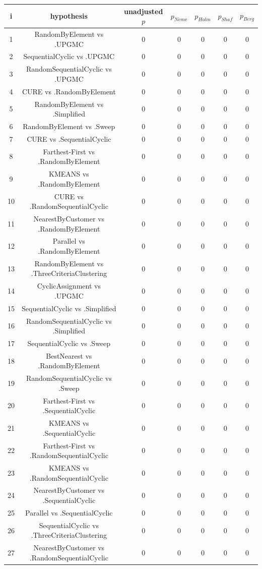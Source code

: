 \documentclass[a4paper,10pt]{article}
\begin{document}
\begin{landscape}
\begin{table}[!htp]
\centering\scriptsize
\begin{tabular}{ccccccc}
i&hypothesis&unadjusted $p$&$p_{Neme}$&$p_{Holm}$&$p_{Shaf}$&$p_{Berg}$\\
\hline1&RandomByElement vs .UPGMC&0&0&0&0&0\\
2&SequentialCyclic vs .UPGMC&0&0&0&0&0\\
3&RandomSequentialCyclic vs .UPGMC&0&0&0&0&0\\
4&CURE vs .RandomByElement&0&0&0&0&0\\
5&RandomByElement vs .Simplified&0&0&0&0&0\\
6&RandomByElement vs .Sweep&0&0&0&0&0\\
7&CURE vs .SequentialCyclic&0&0&0&0&0\\
8&Farthest-First vs .RandomByElement&0&0&0&0&0\\
9&KMEANS vs .RandomByElement&0&0&0&0&0\\
10&CURE vs .RandomSequentialCyclic&0&0&0&0&0\\
11&NearestByCustomer vs .RandomByElement&0&0&0&0&0\\
12&Parallel vs .RandomByElement&0&0&0&0&0\\
13&RandomByElement vs .ThreeCriteriaClustering&0&0&0&0&0\\
14&CyclicAssignment vs .UPGMC&0&0&0&0&0\\
15&SequentialCyclic vs .Simplified&0&0&0&0&0\\
16&RandomSequentialCyclic vs .Simplified&0&0&0&0&0\\
17&SequentialCyclic vs .Sweep&0&0&0&0&0\\
18&BestNearest vs .RandomByElement&0&0&0&0&0\\
19&RandomSequentialCyclic vs .Sweep&0&0&0&0&0\\
20&Farthest-First vs .SequentialCyclic&0&0&0&0&0\\
21&KMEANS vs .SequentialCyclic&0&0&0&0&0\\
22&Farthest-First vs .RandomSequentialCyclic&0&0&0&0&0\\
23&KMEANS vs .RandomSequentialCyclic&0&0&0&0&0\\
24&NearestByCustomer vs .SequentialCyclic&0&0&0&0&0\\
25&Parallel vs .SequentialCyclic&0&0&0&0&0\\
26&SequentialCyclic vs .ThreeCriteriaClustering&0&0&0&0&0\\
27&NearestByCustomer vs .RandomSequentialCyclic&0&0&0&0&0\\

\end{tabular}
\end{table}
\end{landscape}
\end{document}
